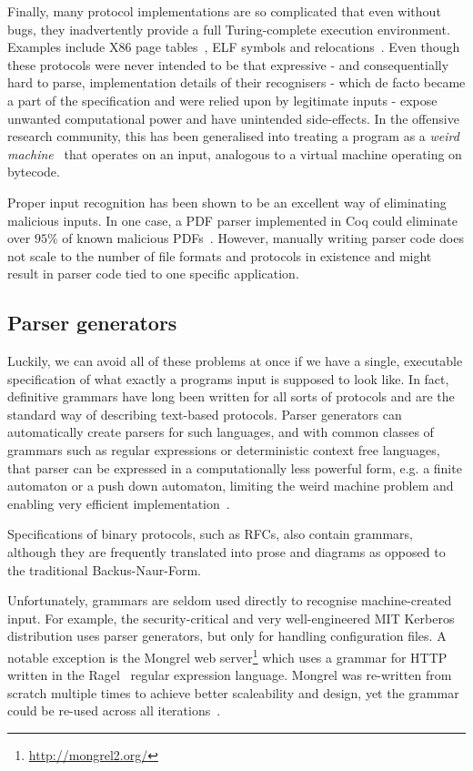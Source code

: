 Finally, many protocol implementations are so complicated that even
without bugs, they inadvertently provide a full Turing-complete execution
environment. Examples include X86 page tables~\cite{bangert2013page},
ELF symbols and relocations~\cite{shapiro2013weird}. Even though
these protocols were never intended to be that expressive -
and consequentially hard to parse, implementation details of their
recognisers - which de facto became a part of the specification and were
relied upon by legitimate inputs - expose unwanted computational power
and have unintended side-effects.  In the offensive research community,
this has been generalised into treating a program as a \textit{weird
machine}~\cite{bratus2011exploit} that operates on an input, analogous
to a virtual machine operating on bytecode.

Proper input recognition has been shown to be an excellent way of
eliminating malicious inputs. In one case, a  PDF parser implemented in
Coq could eliminate over $95\%$ of known malicious PDFs~\cite{Bogk-PDF}.
However, manually writing parser code does not scale to the number of
file formats  and protocols in existence and might result in parser code
tied to one specific application.


\subsection{Parser generators}

Luckily, we can avoid all of these problems at once if we have a single,
executable specification of what exactly a programs input is supposed
to look like. In fact, definitive grammars have long been written for
all sorts of protocols and are the standard way of describing text-based
protocols.  Parser generators can automatically create parsers for such
languages, and with common classes of grammars such as regular expressions
or deterministic context free languages, that parser can be expressed
in a computationally less powerful form, e.g. a finite automaton or a
push down automaton, limiting the weird machine problem and enabling
very efficient implementation~\cite{Knuth1965607}.

Specifications of binary protocols, such as RFCs, also contain grammars,
although they are frequently translated into prose and diagrams as
opposed to the traditional Backus-Naur-Form.

Unfortunately, grammars are seldom used directly to recognise
machine-created input. For example, the security-critical and very
well-engineered MIT Kerberos distribution uses parser generators, but
only for handling configuration files. A notable exception is the Mongrel
web server\footnote{\url{http://mongrel2.org/}} which uses a grammar
for HTTP written in the Ragel~\cite{ragel-paper} regular expression
language. Mongrel was re-written from scratch multiple times to achieve
better scaleability and design, yet the grammar could be  re-used across
all iterations~\cite{patterson-citation}.

